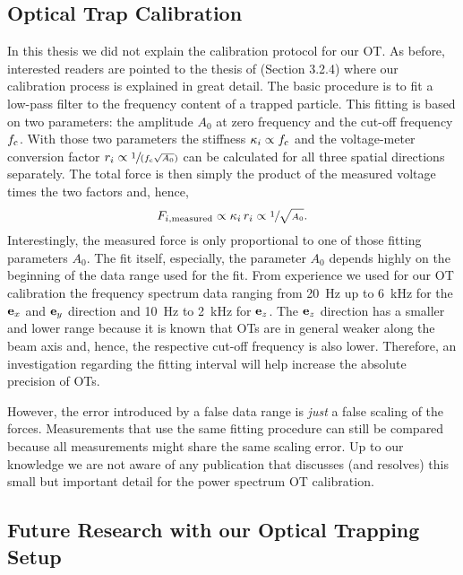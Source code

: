 \subsection{Optical Trap Calibration}

In this thesis we did not explain the calibration protocol for our OT. As 
before, interested readers are pointed to the thesis of  
(Section 3.2.4) where our calibration process is explained in great detail. The 
basic procedure is to fit a low-pass filter to the frequency content of a 
trapped particle. This fitting is based on two parameters: the amplitude 
$A_{0}$ at zero frequency and the cut-off frequency $f_{\mathrm{c}}$. With those 
two parameters the stiffness $\kappa_{i}\propto f_{\mathrm{c}}$ and the 
voltage-meter conversion factor $r_{i}\propto \sfrac{1}{(f_{\mathrm{c}}\sqrt{A_{0}} 
)}$ can be calculated for all three spatial directions separately. The total 
force is then simply the product of the measured voltage times the two factors 
and, hence, \begin{equation}
  F_{i,\mathrm{measured}}\propto \kappa_{i}\,r_{i}\propto 
  \sfrac{1}{\sqrt{A_{0}}}.
\end{equation}
Interestingly, the measured force is only proportional to one of those fitting 
parameters $A_{0}$. The fit itself, especially, the parameter $A_{0}$ depends 
highly on the beginning of the data range used for the fit. From experience we 
used for our OT calibration the frequency spectrum data ranging from 
\SI{20}{\hertz} up to \SI{6}{\kilo\hertz} for the $\vb{e}_{x}$ and $\vb{e}_{y}$ direction and 
\SI{10}{\hertz} to \SI{2}{\kilo\hertz} for $\vb{e}_{z}$. The $\vb{e}_{z}$ direction has a 
smaller and lower range because it is known that OTs are in general weaker 
along the beam axis and, hence, the respective cut-off frequency is also lower. 
Therefore, an investigation regarding the fitting interval will help increase 
the absolute precision of OTs.

However, the error introduced by a false data range is \emph{just} a false 
scaling of the forces. Measurements that use the same fitting procedure can 
still be compared because all measurements might share the same scaling error. 
Up to our knowledge we are not aware of any publication that discusses (and 
resolves) this small but important detail for the power spectrum OT 
calibration.

\subsection{Future Research with our Optical Trapping Setup}

